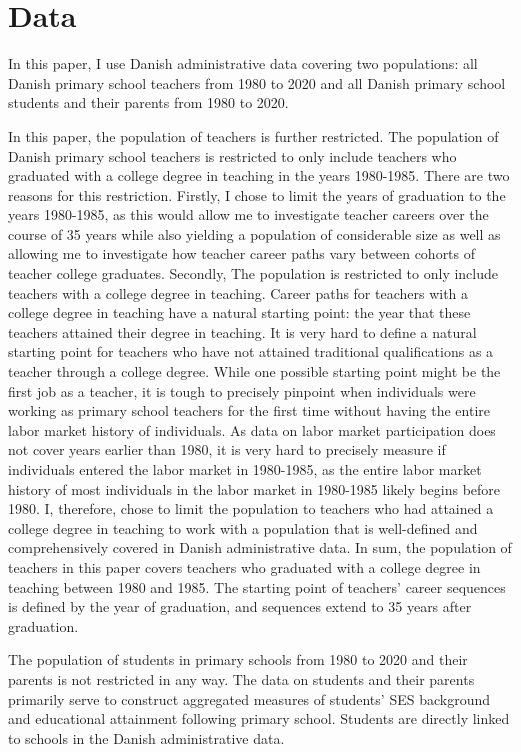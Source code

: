\documentclass[
]{article}
\begin{document}
\hypertarget{data}{%
\section{Data}\label{data}}

In this paper, I use Danish administrative data covering two populations: all Danish primary school teachers from 1980 to 2020 and all Danish primary school students and their parents from 1980 to 2020.

In this paper, the population of teachers is further restricted. The population of Danish primary school teachers is restricted to only include teachers who graduated with a college degree in teaching in the years 1980-1985. There are two reasons for this restriction. Firstly, I chose to limit the years of graduation to the years 1980-1985, as this would allow me to investigate teacher careers over the course of 35 years while also yielding a population of considerable size as well as allowing me to investigate how teacher career paths vary between cohorts of teacher college graduates. Secondly, The population is restricted to only include teachers with a college degree in teaching. Career paths for teachers with a college degree in teaching have a natural starting point: the year that these teachers attained their degree in teaching. It is very hard to define a natural starting point for teachers who have not attained traditional qualifications as a teacher through a college degree. While one possible starting point might be the first job as a teacher, it is tough to precisely pinpoint when individuals were working as primary school teachers for the first time without having the entire labor market history of individuals. As data on labor market participation does not cover years earlier than 1980, it is very hard to precisely measure if individuals entered the labor market in 1980-1985, as the entire labor market history of most individuals in the labor market in 1980-1985 likely begins before 1980. I, therefore, chose to limit the population to teachers who had attained a college degree in teaching to work with a population that is well-defined and comprehensively covered in Danish administrative data.
In sum, the population of teachers in this paper covers teachers who graduated with a college degree in teaching between 1980 and 1985. The starting point of teachers' career sequences is defined by the year of graduation, and sequences extend to 35 years after graduation.

The population of students in primary schools from 1980 to 2020 and their parents is not restricted in any way. The data on students and their parents primarily serve to construct aggregated measures of students' SES background and educational attainment following primary school. Students are directly linked to schools in the Danish administrative data.
\end{document}
